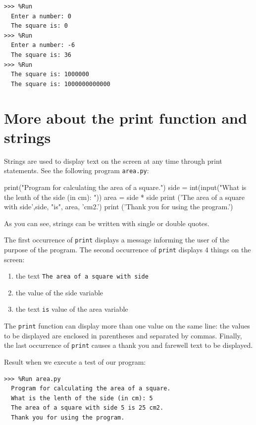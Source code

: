\begin{Verbatim}[frame=single, label={\em do more tests}]
>>> %Run 
  Enter a number: 0
  The square is: 0
>>> %Run 
  Enter a number: -6
  The square is: 36
>>> %Run 
  The square is: 1000000
  The square is: 1000000000000
\end{Verbatim}

\section{More about the print function and strings}

Strings are used to display text on the screen at any time through print statements.
%
See the following program \verb|area.py|:\\

\begin{python}
print("Program for calculating the area of a square.")
side = int(input("What is the lenth of the side (in cm): "))
area = side * side
print ('The area of a square with side',side, "is", area, 'cm2.')
print ('Thank you for using the program.')
\end{python}



As you can see, strings can be written with single or double quotes.

The first occurrence of \verb+print+ displays a message informing the user of the purpose of the program.
%
The second occurrence of \verb+print+ displays 4 things on the screen:

\begin{enumerate}[nosep]
    \item the text \verb|The area of a square with side|
    \item the value of the side variable
    \item the text \verb|is|
    \itemthe value of the area variable
\end{enumerate}

The \verb+print+ function can display more than one value on the same line: the values to be displayed are enclosed in parentheses and separated by commas.
%
Finally, the last occurrence of \verb+print+ causes a thank you and farewell text to be displayed.

Result when we execute a test of our program:

\begin{Verbatim}[frame=single]
>>> %Run area.py
  Program for calculating the area of a square.
  What is the lenth of the side (in cm): 5
  The area of a square with side 5 is 25 cm2.
  Thank you for using the program.
\end{Verbatim}

